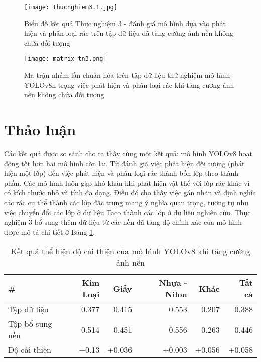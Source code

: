 \documentclass[../the.tex]{subfiles}
\begin{document}
\begin{figure}[H]
    \centering
    \texttt{[image: thucnghiem3.1.jpg]}
    \caption{Biểu đồ kết quả Thực nghiệm 3 - đánh giá mô hình dựa vào phát hiện và phân loại rác trên tập dữ liệu đã tăng cường ảnh nền không chứa đối tượng}
    \label{fig:thucnghiem3}
\end{figure}

\begin{figure}[H]
    \centering
    \texttt{[image: matrix\_tn3.png]}
    \caption{Ma trận nhầm lẫn chuẩn hóa trên tập dữ liệu thử nghiệm mô hình YOLOv8n trọng việc phát hiện và phân loại rác khi tăng cường ảnh nền không chứa đối tượng}
    \label{fig:thucnghiem3.1}
\end{figure}


\section{Thảo luận}
 {\fontsize{13}{12} \selectfont

  Các kết quả được so sánh cho ta thấy cùng một kết quả: mô hình YOLOv8 hoạt động tốt hơn hai mô hình còn lại.
  Từ đánh giá việc phát hiện đối tượng (phát hiện một lớp) đến việc phát hiện và phân loại rác thành bốn lớp theo thành phần.
  Các mô hình luôn gặp khó khăn khi phát hiện vật thể với lớp rác khác vì có kích thước nhỏ và tính đa dạng.
  Điều đó cho thấy việc gán nhãn và định nghĩa các rác cụ thể thành các lớp đặc trưng mang ý nghĩa quan trọng,
  tương tự như việc chuyển đổi các lớp ở dữ liệu Taco thành các lớp ở dữ liệu nghiên cứu.
  Thực nghiệm 3 bổ sung thêm dữ liệu từ các nền đã tăng độ chính xác của mô hình được mô tả chi tiết ở Bảng \ref{tab:thaoluan1}.

 }


\begin{table}[h!]
    \centering
    \caption{Kết quả thể hiện độ cải thiện của mô hình YOLOv8 khi tăng cường ảnh nền}
    \begin{tabular}{|l|r|r|r|r|r|}
        \hline
        \multicolumn{1}{|l|}{\textbf{\#}} & \textbf{Kim Loại} & \textbf{Giấy} & \textbf{Nhựa - Nilon} & \textbf{Khác} & \textbf{Tất cả} \\ \hline
        Tập dữ liệu                       & 0.377             & 0.415         & 0.553                 & 0.207         & 0.388           \\ \hline
        Tập bổ sung nền                 & 0.514             & 0.451         & 0.556                 & 0.263         & 0.446           \\ \hline
        Độ cải thiện                      & +0.13             & +0.036        & +0.003                & +0.056        & +0.058          \\ \hline
    \end{tabular}
    \label{tab:thaoluan1}
\end{table}
\end{document}
